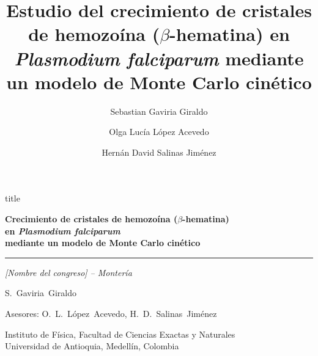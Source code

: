 \documentclass[aspectratio=169,11pt]{beamer}
\title[kMC para hemozoína]{Estudio del crecimiento de cristales de hemozoína
  ($\beta$-hematina) en \textit{Plasmodium falciparum} mediante un modelo de
  Monte Carlo cinético}
\author{Sebastian Gaviria Giraldo \and Olga Lucía López Acevedo \and Hernán David Salinas Jiménez}
\institute{Instituto de Física, Universidad de Antioquia}
\begin{document}
\begin{frame}[plain]
  \vfill
  \begin{beamercolorbox}[wd=\textwidth,sep=1em,center,rounded=true,shadow=false]{title}
    {\Large\bfseries Crecimiento de cristales de hemozoína ($\beta$-hematina)\\[0.2em]
     en \textit{Plasmodium falciparum}\\[0.2em]
     mediante un modelo de Monte Carlo cinético\par}
    \vspace{0.5em}
    {\color{white!60!azul}\rule{0.45\linewidth}{0.4pt}\par}
    \vspace{0.35em}
    {\normalsize\itshape [Nombre del congreso] -- Montería\par}
  \end{beamercolorbox}
  \vspace{1.2em}
  \centering
  {\large S.~Gaviria~Giraldo\par}
  \vspace{0.2em}
  {\small Asesores: O.~L.~López~Acevedo,\; H.~D.~Salinas~Jiménez\par}
  \vspace{0.5em}
  {\small\color{gris}Instituto de Física, Facultad de Ciencias Exactas y Naturales\\
   Universidad de Antioquia, Medellín, Colombia\par}
  \vspace{0.7em}
  \par
  \vfill
\end{frame}
\end{document}

